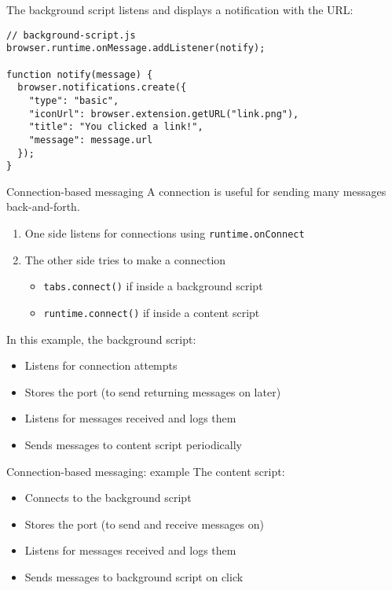 \documentclass[../index.tex]{subfiles}
\begin{document}
\begin{frame}[fragile]{\currenttitle}
  The background script listens and displays a notification with the URL: \\[1em]

  \begin{lstlisting}[language=ES6]
// background-script.js
browser.runtime.onMessage.addListener(notify);

function notify(message) {
  browser.notifications.create({
    "type": "basic",
    "iconUrl": browser.extension.getURL("link.png"),
    "title": "You clicked a link!",
    "message": message.url
  });
}
  \end{lstlisting}
\end{frame}

\renewcommand{\currenttitle}{Connection-based messaging}
\begin{frame}[fragile]{\currenttitle}
  A connection is useful for sending many messages back-and-forth. \\

  \begin{enumerate}
    \item One side listens for connections using \texttt{runtime.onConnect}
    \item The other side tries to make a connection
      \begin{itemize}
        \item \texttt{tabs.connect()} if inside a background script
        \item \texttt{runtime.connect()} if inside a content script
      \end{itemize}
  \end{enumerate}
  In this example, the background script:

  \begin{itemize}
    \item Listens for connection attempts
    \item Stores the port (to send returning messages on later)
    \item Listens for messages received and logs them
    \item Sends messages to content script periodically
  \end{itemize}

\end{frame}

\renewcommand{\currenttitle}{Connection-based messaging: example}
\begin{frame}[fragile]{\currenttitle}
  The content script:
  
  \begin{itemize}
    \item Connects to the background script
    \item Stores the port (to send and receive messages on)
    \item Listens for messages received and logs them
    \item Sends messages to background script on click
  \end{itemize}
\end{frame}
\end{document}
